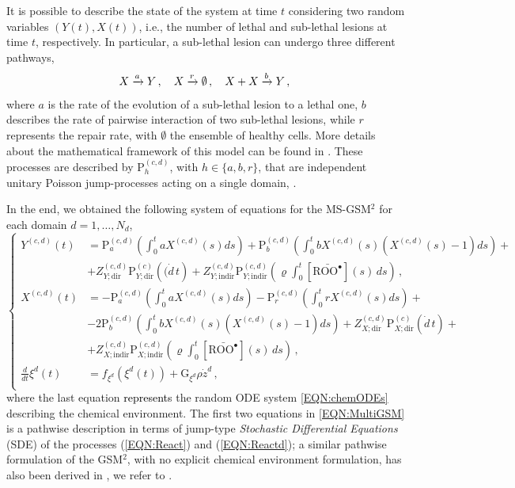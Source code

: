 \documentclass[10pt]{iopart}
\newcommand{\ema}[1]{\textcolor{black}{#1}}
\numberwithin{table}{section}
\begin{document}
It is possible to describe the state of the system at time $t$ considering two random variables $\left (Y(t),X(t)\right )$, i.e., the number of lethal and sub-lethal lesions at time $t$, respectively. In particular, a sub-lethal lesion can undergo three different pathways,
\begin{equation}\label{EQN:React}
X \xrightarrow{a} Y\,,\quad X \xrightarrow{r} \emptyset\,,\quad X + X \xrightarrow{b} Y\,,\\
\end{equation}
where $a$ is the rate of the evolution of a sub-lethal lesion to a lethal one, $b$ describes the rate of pairwise interaction of two sub-lethal lesions, while $r$ represents the repair rate, with $\emptyset$ the ensemble of healthy cells. More details about the mathematical framework of this model can be found in \cite{cordoni2021generalized, cordoni2022cell}. These processes are described by $\mathrm{P}^{(c,d)}_h$, with $h \in \{a,b,r\}$, that are independent unitary Poisson jump-processes acting on a single domain, \cite{Wei}.

In the end, we obtained the following system of equations for the MS-GSM$^2$ for each domain $d =1,\dots, N_d$,
\begin{equation}\label{EQN:MultiGSM}
\begin{cases}
Y^{(c,d)}(t) &= \mathrm{P}^{(c,d)}_a\left ( \int_0^t a X^{(c,d)}(s)ds\right )+\mathrm{P}^{(c,d)}_b\left (\int_0^t b X^{(c,d)}(s)(X^{(c,d)}(s)-1)ds\right ) +\\&+ Z_{Y;\mathrm{dir}}^{(c,d)}\mathrm{P}^{(c)}_{Y; \mathrm{dir}}\left ((\dot{d} \,t\right ) + Z_{Y;\mathrm{indir}}^{(c,d)}\mathrm{P}^{(c,d)}_{Y; \mathrm{indir}}\left (\varrho \int_{0}^t [\bar{\mathrm{ROO^\bullet}}](s) \,ds \right )\,,\\
X^{(c,d)}(t) &=  - \mathrm{P}^{(c,d)}_a\left (\int_0^ta X^{(c,d)}(s)ds\right ) - \mathrm{P}^{(c,d)}_r\left (\int_0^t r X^{(c,d)}(s)ds\right ) +\\
&- 2\mathrm{P}^{(c,d)}_b\left (\int_0^t b X^{(c,d)}(s)(X^{(c,d)}(s)-1) ds\right ) +Z_{X;\mathrm{dir}}^{(c,d)}\mathrm{P}^{(c)}_{X; \mathrm{dir}}\left (\dot{d} \, t\right )+\\ &+ Z_{X;\mathrm{indir}}^{(c,d)}\mathrm{P}^{(c,d)}_{X; \mathrm{indir}}\left (\varrho \int_{0}^t [\bar{\mathrm{ROO^\bullet}}](s) \,ds \right )\,,\\
\frac{d}{dt}\xi^d(t) &= f_{\xi^d} \left (\xi^d(t)\right ) + \mathrm{G}_{\xi^d} \rho \dot{z}^d\,,\\ 
\end{cases}
\end{equation}
where the last equation \ema{represents} the random ODE system \eqref{EQN:chemODEs} describing the chemical environment. The first two equations in \eqref{EQN:MultiGSM} is a pathwise description in terms of jump-type \textit{Stochastic Differential Equations} (SDE) of the processes (\ref{EQN:React}) and (\ref{EQN:Reactd}); a similar pathwise formulation of the GSM$^2$, with no explicit chemical environment formulation, has also been derived in \cite{cordoni2023spatial}, we refer to \cite[Chapter 13]{Wei}.
\end{document}
